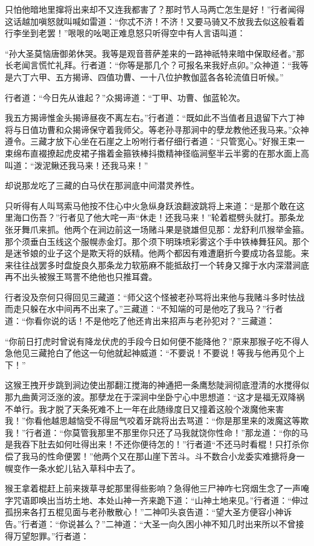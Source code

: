 \documentclass[12pt,UTF8]{ctexbook}
\begin{document}
{只怕他暗地里撺将出来却不又连我都害了？那时节人马两亡怎生是好！”行者闻得这话越加嗔怒就叫喊如雷道：“你忒不济！不济！又要马骑又不放我去似这般看着行李坐到老罢！”哏哏的吆喝正难息怒只听得空中有人言语叫道：

“孙大圣莫恼唐御弟休哭。我等是观音菩萨差来的一路神祇特来暗中保取经者。”那长老闻言慌忙礼拜。行者道：“你等是那几个？可报名来我好点卯。”众神道：“我等是六丁六甲、五方揭谛、四值功曹、一十八位护教伽蓝各各轮流值日听候。”

行者道：“今日先从谁起？”众揭谛道：“丁甲、功曹、伽蓝轮次。

我五方揭谛惟金头揭谛昼夜不离左右。”行者道：“既如此不当值者且退留下六丁神将与日值功曹和众揭谛保守着我师父。等老孙寻那涧中的孽龙教他还我马来。”众神遵令。三藏才放下心坐在石崖之上吩咐行者仔细行者道：“只管宽心。”好猴王束一束绵布直裰撩起虎皮裙子揝着金箍铁棒抖擞精神径临涧壑半云半雾的在那水面上高叫道：“泼泥鳅还我马来！还我马来！”

却说那龙吃了三藏的白马伏在那涧底中间潜灵养性。

只听得有人叫骂索马他按不住心中火急纵身跃浪翻波跳将上来道：“是那个敢在这里海口伤吾？”行者见了他大咤一声“休走！还我马来！”轮着棍劈头就打。那条龙张牙舞爪来抓。他两个在涧边前这一场赌斗果是骁雄但见那：龙舒利爪猴举金箍。那个须垂白玉线这个服幌赤金灯。那个须下明珠喷彩雾这个手中铁棒舞狂风。那个是迷爷娘的业子这个是欺天将的妖精。他两个都因有难遭磨折今要成功各显能。来来往往战罢多时盘旋良久那条龙力软筋麻不能抵敌打一个转身又撺于水内深潜涧底再不出头被猴王骂詈不绝他也只推耳聋。

行者没及奈何只得回见三藏道：“师父这个怪被老孙骂将出来他与我赌斗多时怯战而走只躲在水中间再不出来了。”三藏道：“不知端的可是他吃了我马？”行者道：“你看你说的话！不是他吃了他还肯出来招声与老孙犯对？”三藏道：

“你前日打虎时曾说有降龙伏虎的手段今日如何便不能降他？”原来那猴子吃不得人急他见三藏抢白了他这一句他就起神威道：“不要说！不要说！等我与他再见个上下！”

这猴王拽开步跳到涧边使出那翻江搅海的神通把一条鹰愁陡涧彻底澄清的水搅得似那九曲黄河泛涨的波。那孽龙在于深涧中坐卧宁心中思想道：“这才是福无双降祸不单行。我才脱了天条死难不上一年在此随缘度日又撞着这般个泼魔他来害我！”你看他越思越恼受不得屈气咬着牙跳将出去骂道：“你是那里来的泼魔这等欺我！”行者道：“你莫管我那里不那里你只还了马我就饶你性命！”那龙道：“你的马是我吞下肚去如何吐得出来！不还你便待怎的！”行者道“不还马时看棍！只打杀你偿了我马的性命便罢！”他两个又在那山崖下苦斗。斗不数合小龙委实难搪将身一幌变作一条水蛇儿钻入草科中去了。

猴王拿着棍赶上前来拨草寻蛇那里得些影响？急得他三尸神咋七窍烟生念了一声唵字咒语即唤出当坊土地、本处山神一齐来跪下道：“山神土地来见。”行者道：“伸过孤拐来各打五棍见面与老孙散散心！”二神叩头哀告道：“望大圣方便容小神诉告。”行者道：“你说甚么？”二神道：“大圣一向久困小神不知几时出来所以不曾接得万望恕罪。”行者道：

}
\end{document}
